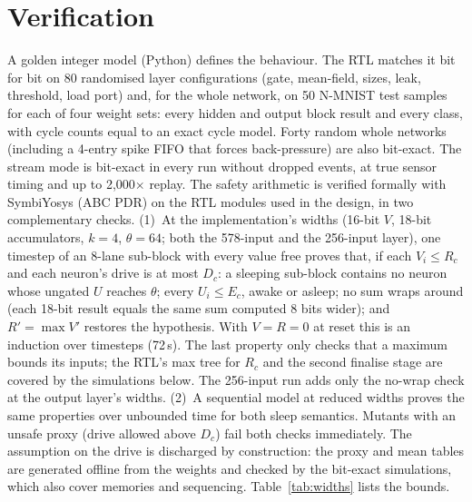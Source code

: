 \documentclass[conference]{IEEEtran}
\begin{document}
\section{Verification}
A golden integer model (Python) defines the behaviour. The RTL matches it bit for bit on 80 randomised layer
configurations (gate, mean-field, sizes, leak, threshold, load port) and, for the whole network, on 50 N-MNIST test
samples for each of four weight sets: every hidden and output block result and every class, with cycle counts equal
to an exact cycle model. Forty random whole networks (including a 4-entry spike FIFO that forces back-pressure) are also bit-exact. The
stream mode is bit-exact in every run without dropped events, at true sensor timing and up to 2,000$\times$ replay. The
safety arithmetic is verified formally with SymbiYosys (ABC PDR) on the RTL modules used in the design, in two
complementary checks. (1)~At the implementation's widths (16-bit $V$, 18-bit accumulators, $k=4$, $\theta=64$; both
the 578-input and the 256-input layer), one timestep of an 8-lane sub-block with every value free proves that, if
each $V_i\le R_c$ and each neuron's drive is at most $D_c$: a sleeping sub-block contains no neuron whose ungated $U$
reaches $\theta$; every $U_i\le E_c$, awake or asleep; no sum wraps around (each 18-bit result equals the same sum
computed 8 bits wider); and $R'=\max V'$ restores the hypothesis. With $V=R=0$ at reset this is an induction over
timesteps (72\,s). The last property only checks that a maximum bounds its inputs; the RTL's max tree for $R_c$ and
the second finalise stage are covered by the simulations below. The 256-input run adds only the no-wrap check at the
output layer's widths. (2)~A sequential model at reduced widths proves the same properties over unbounded time for
both sleep semantics. Mutants with an unsafe proxy (drive allowed above $D_c$) fail both checks immediately. The
assumption on the drive is discharged by construction: the proxy and mean tables are generated offline from the
weights and checked by the bit-exact simulations, which also cover memories and sequencing. Table~\ref{tab:widths}
lists the bounds.
\end{document}
